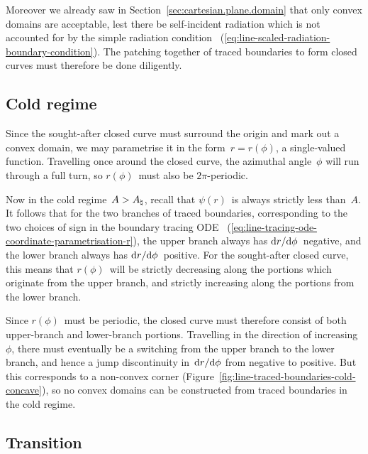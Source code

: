 Moreover we already saw in Section~\ref{sec:cartesian.plane.domain}
that only convex domains are acceptable,
lest there be self-incident radiation which is not accounted for
by the simple radiation condition~%
  (\ref{eq:line-scaled-radiation-boundary-condition}).
The patching together of traced boundaries to form closed curves
must therefore be done diligently.

\subsection{Cold regime}
\label{sec:polar.tracing.cold}

Since the sought-after closed curve must surround the origin
and mark out a convex domain,
we may parametrise it in the form~$r = r (\phi)$,
a single-valued function.
Travelling once around the closed curve,
the azimuthal angle~$\phi$ will run through a full turn,
so $r (\phi)$~must also be $2 \pi$-periodic.

Now in the cold regime~$A > A_\natural$,
recall that $\psi (r)$~is always strictly less than~$A$.
It follows that for the two branches of traced boundaries,
corresponding to the two choices of sign in the boundary tracing ODE~%
  (\ref{eq:line-tracing-ode-coordinate-parametrisation-r}),
the upper branch always has $\mathop{}\!\mathrm{d} r / {\mathop{}\!\mathrm{d}\phi}$~negative,
and the lower branch always has $\mathop{}\!\mathrm{d} r / {\mathop{}\!\mathrm{d}\phi}$~positive.
For the sought-after closed curve,
this means that $r (\phi)$~will be strictly decreasing
along the portions which originate from the upper branch,
and strictly increasing along the portions from the lower branch.

\begin{figure}
\end{figure}

Since $r (\phi)$~must be periodic,
the closed curve must therefore consist of both
upper-branch and lower-branch portions.
Travelling in the direction of increasing~$\phi$,
there must eventually be a switching
from the upper branch to the lower branch,
and hence a jump discontinuity in~$\mathop{}\!\mathrm{d} r / {\mathop{}\!\mathrm{d}\phi}$
from negative to positive.
But this corresponds to a non-convex corner
(Figure~\ref{fig:line-traced-boundaries-cold-concave}),
so no convex domains can be constructed from traced boundaries
in the cold regime.

\subsection{Transition}
\label{sec:polar.tracing.transition}

